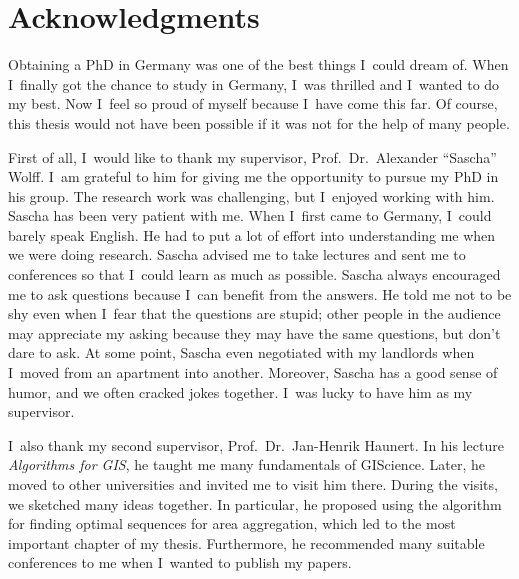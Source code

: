 {%

\section{Acknowledgments}

Obtaining a PhD in Germany was 
one of the best things I~could dream of.
When I~finally got the chance to study in Germany,
I~was thrilled and I~wanted to do my best.
Now I~feel so proud of myself because I~have come this far.
Of course, this thesis would not have been possible
if it was not for the help of many people.

First of all, I~would like to thank my supervisor, 
Prof.\ Dr.\ Alexander ``Sascha'' Wolff.
I~am grateful to him for giving me 
the opportunity to pursue my PhD in his group.
The research work was challenging,
but I~enjoyed working with him.
Sascha has been very patient with me.
When I~first came to Germany, I~could barely speak English.
He had to put a lot of effort into understanding me
when we were doing research.
Sascha advised me to take lectures and sent me to conferences
so that I~could learn as much as possible.
Sascha always encouraged me to ask questions
because I~can benefit from the answers.
He told me not to be shy even when 
I~fear that the questions are stupid;
other people in the audience may appreciate my asking
because they may have the same questions,
but don't dare to ask.
At some point,
Sascha even negotiated with my landlords 
when I~moved from an apartment into another.
Moreover, Sascha has a good sense of humor, 
and we often cracked jokes together.
I~was lucky to have him as my supervisor.

I~also thank my second supervisor, 
Prof.\ Dr.\ Jan-Henrik Haunert.  
In his lecture \emph{Algorithms for GIS}, 
he taught me many fundamentals of GIScience.  
Later, he moved to other universities 
and invited me to visit him there.
During the visits, we sketched many ideas together.
In particular, he proposed %
using the \Astar algorithm 
for finding optimal sequences for area aggregation,
which led to the most important chapter of my thesis.
Furthermore, he recommended many suitable conferences to me
when I~wanted to publish my papers.

}
